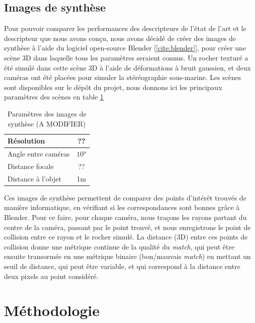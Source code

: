 \documentclass[
	a4paper, %
	10pt, %
	unnumberedsections, %
	twoside, %
]{LTJournalArticle}
\begin{document}
\subsection{Images de synthèse}

Pour pouvoir comparer les performances des descripteurs de l'état de l'art et le descripteur que nous avons conçu, nous avons décidé de créer des images de synthèse à l'aide du logiciel open-source Blender [\ref{cite:blender}], pour créer une scène 3D dans laquelle tous les paramètres seraient connus.
Un rocher texturé a été simulé dans cette scène 3D à l'aide de déformations à bruit gaussien, et deux caméras ont été placées pour simuler la stéréographie sous-marine.
Les scènes sont disponibles sur le dépôt du projet, nous donnons ici les principaux paramètres des scènes en table \ref{table:params_syn_imgs}

\begin{table}[t]
	\begin{adjustbox}{width=\columnwidth, left}
		\begin{tabular}{l c}
			\hline
			Résolution          & ??    \\
			\hline
			Angle entre caméras & $10$° \\
			Distance focale     & ??    \\
			Distance à l'objet  & 1m    \\
			\hline
		\end{tabular}
	\end{adjustbox}
	\label{table:params_syn_imgs}
	\caption{Paramètres des images de synthèse (A MODIFIER)}
\end{table}

Ces images de synthèse permettent de comparer des points d'intérêt trouvés de manière informatique, en vérifiant si les correspondances sont bonnes grâce à Blender.
Pour ce faire, pour chaque caméra, nous traçons les rayons partant du centre de la caméra, passant par le point trouvé, et nous enregistrons le point de collision entre ce rayon et le rocher simulé.
La distance (3D) entre ces points de collision donne une métrique continue de la qualité du \textit{match}, qui peut être ensuite transormée en une métrique binaire (bon/mauvais \textit{match}) en mettant un seuil de distance, qui peut être variable, et qui correspond à la distance entre deux pixels au point considéré.

\section{Méthodologie}
\end{document}
